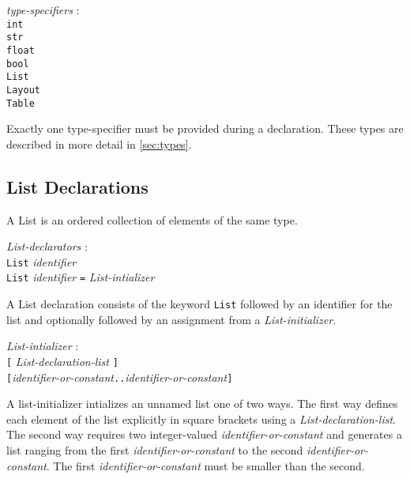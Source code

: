 \documentclass{article}
\begin{document}
\begin{tabbing}
	\= \emph{type}\=\emph{-specifiers} : \\
		\>\> \texttt{int} \\
		\>\> \texttt{str} \\
		\>\> \texttt{float} \\
		\>\> \texttt{bool} \\
		\>\> \texttt{List} \\
		\>\> \texttt{Layout} \\
		\>\> \texttt{Table} \\
\end{tabbing}

Exactly one type-specifier must be provided during a declaration. These types are described in more detail in \ref{sec:types}.

\subsection{List Declarations}
\label{sec:list}
A List is an ordered collection of elements of the same type. 
\begin{tabbing}
	\= \emph{List}\=\emph{-declarators} : \\
		\> \> \texttt{List} \emph{identifier} \\
		\>\> \texttt{List} \emph{identifier} \texttt{=} \emph{List-intializer } \texttt{} 
\end{tabbing}
A List declaration consists of the keyword \texttt{List} followed by an identifier for the list and optionally followed by an assignment from a \emph{List-initializer}.

\begin{tabbing}
	\= \emph{List}\=\emph{-intializer} : \\
		\> \> \texttt{[} \emph{List-declaration-list} \texttt{]} \\
		\>\> \texttt{[}\emph{identifier-or-constant}\texttt{..}\emph{identifier-or-constant}\texttt{]}
\end{tabbing}

A list-initializer intializes an unnamed list one of two ways. The first way defines each element of the list explicitly in square brackets using a \emph{List-declaration-list}. The second way requires two integer-valued \emph{identifier-or-constant} and generates a list ranging from the first \emph{identifier-or-constant} to the second \emph{identifier-or-constant}. The first \emph{identifier-or-constant} must be smaller than the second.
\end{document}
